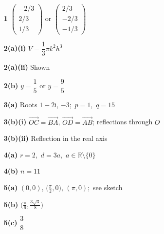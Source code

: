 \documentclass[a4paper,11pt,oneside]{article}
\begin{document}
\clearpage
\thispagestyle{fancy}
\par
\vspace{0.2ex}
\par
\vspace{0.1ex}
\begin{itemize}[leftmargin=2.0em,itemsep=0.02ex,topsep=0.05ex,parsep=0pt]
\item[\textbf{1}] $\begin{pmatrix}-2/3\\2/3\\1/3\end{pmatrix}$ or $\begin{pmatrix}2/3\\-2/3\\-1/3\end{pmatrix}$
\item[\textbf{2(a)(i)}] $V=\dfrac{1}{3}\pi k^{2}h^3$
\item[\textbf{2(a)(ii)}] Shown
\item[\textbf{2(b)}] $y=\dfrac{1}{5}$ or $y=\dfrac{9}{5}$
\item[\textbf{3(a)}] Roots $1-2\mathrm{i}$, $-3$;\ $p=1$,\ $q=15$
\item[\textbf{3(b)(i)}] $\overrightarrow{OC}=\overrightarrow{BA}$, $\overrightarrow{OD}=\overrightarrow{AB}$; reflections through $O$
\item[\textbf{3(b)(ii)}] Reflection in the real axis
\item[\textbf{4(a)}] $r=2$,\ $d=3a$,\ $a\in\mathbb{R}\setminus\{0\}$
\item[\textbf{4(b)}] $n=11$
\item[\textbf{5(a)}] $(0,0)$, $\bigl(\tfrac{\pi}{2},0\bigr)$, $(\pi,0)$;\ see sketch
\item[\textbf{5(b)}] $\bigl(\tfrac{\pi}{6},\tfrac{3\sqrt{3}}{8}\bigr)$
\item[\textbf{5(c)}] $\dfrac{3}{8}$
\end{itemize}
\vspace{0.25ex}
\par
\vspace{0.1ex}
\end{document}
